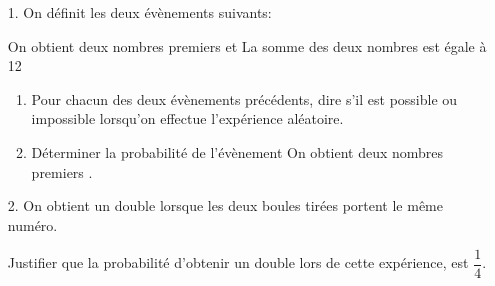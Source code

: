 \documentclass[14 pt]{extarticle}
\theoremstyle{plain}
\begin{document}
\medskip

\begin{enumerate}
\item[1.] On définit les deux évènements suivants:

\og On obtient deux nombres premiers \fg{} et \og La somme des deux nombres est égale à 12 \fg
	\begin{enumerate}
		\item Pour chacun des deux évènements précédents, dire s'il est possible ou impossible lorsqu'on effectue l'expérience aléatoire.
		\item Déterminer la probabilité de l'évènement \og On obtient deux nombres premiers \fg.
	\end{enumerate}
\item[2.] On obtient un \og double \fg{} lorsque les deux boules tirées portent le même numéro. 

Justifier que la probabilité d'obtenir un \og double \fg{} lors de cette expérience, est $\dfrac{1}{4}$.

\end{enumerate}



 	
\end{document}

